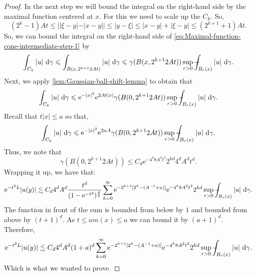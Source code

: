 \documentclass[a4paper,oneside,10pt]{amsproc}
\theoremstyle{plain}
\theoremstyle{remark}
\theoremstyle{definition}
\newcommand{\D}{\,\textup{d}}
\def\Xint#1{\mathchoice
  {\XXint\displaystyle\textstyle{#1}}%
  {\XXint\textstyle\scriptstyle{#1}}%
  {\XXint\scriptstyle\scriptscriptstyle{#1}}%
  {\XXint\scriptscriptstyle\scriptscriptstyle{#1}}%
  \!\int}
\def\XXint#1#2#3{{\setbox0=\hbox{$#1{#2#3}{\int}$ }
    \vcenter{\hbox{$#2#3$ }}\kern-.535\wd0}}
\def\dashint{\Xint-}
\renewcommand{\leq}{\leqslant}
\renewcommand{\leq}{\leqslant}
\newcommand{\e}{\mathrm{e}} %
\renewcommand{\leq}{\leqslant}%
\begin{document}
\begin{proof}
  In the next step we will bound the integral on the right-hand side
  by the maximal function centered at $x$. For this we need to scale
  up the $C_k$. So,
  \begin{equation*}
    (2^k - 1) A t \leq ||\xi - y|- |x - y|| \leq |y - \xi| \leq |x - y|
    + |\xi - y| \leq (2^{k + 1} + 1) A t.
  \end{equation*}
  So, we can bound the integral on the right-hand side of
  \eqref{eq:Maximal-function-cone-intermediate-step-1} by
  \begin{equation*}
    \int_{C_k}  |u| \,\D\gamma \leq \int_{B(x, 2^{k + 1} 2
      A t)} |u| \,\D\gamma \leq \gamma(B(x, 2^{k + 1} 2 A t)) \sup_{r
      > 0} \dashint_{B_r(x)} |u| \, \D\gamma.
  \end{equation*}
  Next, we apply \autoref{lem:Gaussian-ball-shift-lemma} to obtain that
  \begin{equation*}
    \int_{C_k}  |u| \,\D\gamma \leq \e^{-|x|^2} \e^{2 A t
      |x|} \gamma(B(0, 2^{k + 1} 2At)) \sup_{r > 0} \dashint_{B_r(x)} |u| \, \D\gamma.
  \end{equation*}
  Recall that $t |x| \leq a$ so that,
  \begin{equation*}
    \int_{C_k}  |u| \,\D\gamma \leq \e^{-|x|^2} \e^{2 a A} \gamma(B(0,
    2^{k + 1} 2 A t)) \sup_{r > 0} \dashint_{B_r(x)} |u| \, \D\gamma.
  \end{equation*}
  Thus, we note that
  \begin{equation*}
    \gamma(B(0, 2^{k + 1} 2 A t)) \leq C_d \e^{-4^k 8 A^2 t^2} 2^{kd} 4^d A^d t^d.
  \end{equation*}
  Wrapping it up, we have that:
  \begin{equation*}
    \e^{-t^2 L} |u(y)| \lesssim C_d 4^d A^d \frac{t^d}{(1 -
      \e^{-t^2})^{\frac{d}2}} \sum_{k = 0}^\infty \e^{-2^{k+1} [2^k
      -(A^{-1} + a)]} \e^{-4^k 8 A^2 t^2} 2^{kd} \sup_{r > 0}
    \dashint_{B_r(x)} |u| \, \D\gamma.
  \end{equation*}
  The function in front of the sum is bounded from below by $1$ and
  bounded from above by $(t + 1)^d$. As $t \leq a m(x) \leq a$ we can
  bound it by $(a + 1)^d$. Therefore,
  \begin{equation*}
    \e^{-t^2 L} |u(y)| \lesssim C_d 4^d A^d (1 + a)^d \sum_{k = 0}^\infty \e^{-2^{k+1} [2^k
      -(A^{-1} + a)]} \e^{-4^k 8 A^2 t^2} 2^{kd} \sup_{r > 0}
    \dashint_{B_r(x)} |u| \, \D\gamma.
  \end{equation*}
  Which is what we wanted to prove.
\end{proof}


\printbibliography
\end{document}
